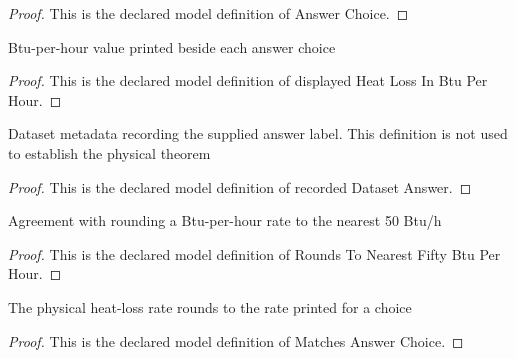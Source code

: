 \begin{proof}
  This is the declared model definition of Answer Choice.
\end{proof}
\begin{definition}
  \label{def:physics:phyx-mini-0487:phyxminiproblems-problemphyxmini0487-displayedheatlossinbtuperhour}
  Btu-per-hour value printed beside each answer choice
\end{definition}
\begin{proof}
  This is the declared model definition of displayed Heat Loss In Btu Per Hour.
\end{proof}
\begin{definition}
  \label{def:physics:phyx-mini-0487:phyxminiproblems-problemphyxmini0487-recordeddatasetanswer}
  Dataset metadata recording the supplied answer label. This definition is not used to establish the physical theorem
\end{definition}
\begin{proof}
  This is the declared model definition of recorded Dataset Answer.
\end{proof}
\begin{definition}
  \label{def:physics:phyx-mini-0487:phyxminiproblems-problemphyxmini0487-roundstonearestfiftybtuperhour}
  Agreement with rounding a Btu-per-hour rate to the nearest 50 Btu/h
\end{definition}
\begin{proof}
  This is the declared model definition of Rounds To Nearest Fifty Btu Per Hour.
\end{proof}
\begin{definition}
  \label{def:physics:phyx-mini-0487:phyxminiproblems-problemphyxmini0487-matchesanswerchoice}
  The physical heat-loss rate rounds to the rate printed for a choice
\end{definition}
\begin{proof}
  This is the declared model definition of Matches Answer Choice.
\end{proof}

